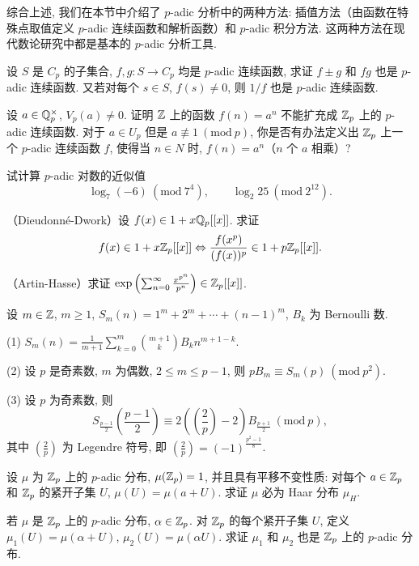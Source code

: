 综合上述, 我们在本节中介绍了 $p$-adic 分析中的两种方法: 插值方法（由函数在特殊点取值定义 $p$-adic 连续函数和解析函数）和 $p$-adic 积分方法. 这两种方法在现代数论研究中都是基本的 $p$-adic 分析工具.

\begin{Exercises}
\item 设 $S$ 是 $C_p$ 的子集合, $f,g\colon S\to C_p$ 均是 $p$-adic 连续函数, 求证 $f\pm g$ 和 $fg$ 也是 $p$-adic 连续函数. 又若对每个 $s\in S$, $f(s)\neq 0$, 则 $1/f$ 也是 $p$-adic 连续函数.

\item 设 $a\in\mathbb{Q}_p^{\times}$, $V_p(a)\neq 0$. 证明 $\mathbb{Z}$ 上的函数 $f(n)=a^n$ 不能扩充成 $\mathbb{Z}_p$ 上的 $p$-adic 连续函数. 对于 $a\in U_p$ 但是 $a\not\equiv 1\ (\mathrm{mod}\ p)$, 你是否有办法定义出 $\mathbb{Z}_p$ 上一个 $p$-adic 连续函数 $f$, 使得当 $n\in N$ 时, $f(n)=a^n$（$n$ 个 $a$ 相乘）?

\item 试计算 $p$-adic 对数的近似值
\[
  \log_7(-6)\ (\mathrm{mod}\ 7^4),\qquad\log_2 25\ (\mathrm{mod}\ 2^{12}).
\]

\item （Dieudonn\'e-Dwork）设 $f(x)\in 1+x\mathbb{Q}_p[[x]]$. 求证
\[
  f(x)\in 1+x\mathbb{Z}_p[[x]]
  \Leftrightarrow\frac{f(x^p)}{(f(x))^p}\in 1+p\mathbb{Z}_p[[x]].
\]

\item （Artin-Hasse）求证 $\exp\left(\sum_{n=0}^{\infty}\frac{x^{p^n}}{p^n}\right)\in\mathbb{Z}_p[[x]]$.

\item 设 $m\in\mathbb{Z}$, $m\geqslant 1$, $S_m(n)=1^m+2^m+\cdots+(n-1)^m$, $B_k$ 为 Bernoulli 数.

(1) $S_m(n)=\frac{1}{m+1}\sum_{k=0}^{m}\binom{m+1}{k}B_kn^{m+1-k}$.

(2) 设 $p$ 是奇素数, $m$ 为偶数, $2\leqslant m\leqslant p-1$, 则 $pB_m\equiv S_m(p)\ (\mathrm{mod}\ p^2)$.

(3) 设 $p$ 为奇素数, 则
\[
  S_{\frac{p-1}{2}}\left(\frac{p-1}{2}\right)
  \equiv 2\left(\left(\frac{2}{p}\right)-2\right)B_{\frac{p+1}{2}}\ (\mathrm{mod}\ p),
\]
其中 $\left(\frac{2}{p}\right)$ 为 Legendre 符号, 即 $\left(\frac{2}{p}\right)=(-1)^{\frac{p^2-1}{8}}$.

\item 设 $\mu$ 为 $\mathbb{Z}_p$ 上的 $p$-adic 分布, $\mu(\mathbb{Z}_p)=1$, 并且具有平移不变性质: 对每个 $a\in\mathbb{Z}_p$ 和 $\mathbb{Z}_p$ 的紧开子集 $U$, $\mu(U)=\mu(a+U)$. 求证 $\mu$ 必为 Haar 分布 $\mu_H$.

\item 若 $\mu$ 是 $\mathbb{Z}_p$ 上的 $p$-adic 分布, $\alpha\in\mathbb{Z}_p$. 对 $\mathbb{Z}_p$ 的每个紧开子集 $U$, 定义 $\mu_1(U)=\mu(\alpha+U)$, $\mu_2(U)=\mu(\alpha U)$. 求证 $\mu_1$ 和 $\mu_2$ 也是 $\mathbb{Z}_p$ 上的 $p$-adic 分布.


\end{Exercises}

